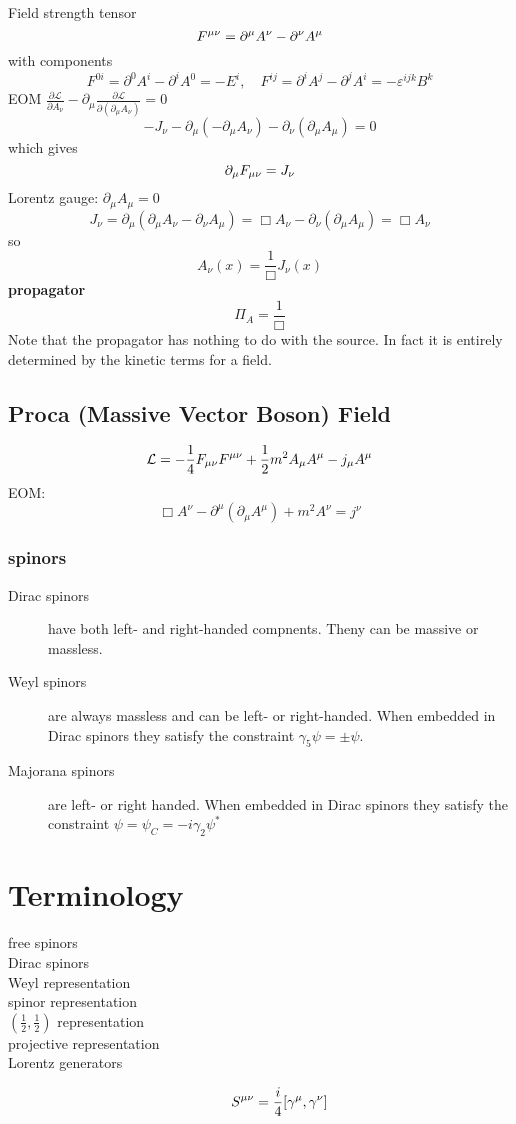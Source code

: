 Field strength tensor 
\[ F^{\mu\nu} = \partial^{\mu}A^{\nu} - \partial^{\nu}A^{\mu} \] 
with components 
\[ F^{0i} = \partial^{0}A^{i} - \partial^{i}A^{0} = -E^{i}, 
\quad
F^{ij} = \partial^{i}A^{j} - \partial^{j}A^{i} = -\varepsilon^{ijk}B^{k} \]
EOM
$\frac{\partial\mathcal{L}}{\partial{A_\nu}}-\partial_\mu\frac{\partial\mathcal{L}}{\partial(\partial_{\mu}A_\nu)}=0$
\[-J_\nu-\partial_\mu(-\partial_{\mu}A_\nu)-\partial_\nu(\partial_{\mu}A_\mu)=0\]
which gives
\[\partial_{\mu}F_{\mu\nu}=J_\nu\]
Lorentz gauge: $\partial_{\mu}A_{\mu}=0$
\[J_{\nu}=\partial_{\mu}(\partial_{\mu}A_\nu-\partial_{\nu}A_{\mu})=\Box{A_\nu}-\partial_{\nu}(\partial_{\mu}A_{\mu})
=\Box{A_{\nu}}\]
so
\[A_{\nu}(x)=\frac{1}{\Box}J_{\nu}(x)\]
\textbf{propagator}
\[\Pi_A=\frac{1}{\Box}\]
Note that the propagator has nothing to do with the source. In fact it is
entirely determined by the kinetic terms for a field.

\subsection{Proca (Massive Vector Boson) Field}
$$ \mathcal{L} = -\frac{1}{4}F_{\mu\nu}F^{\mu\nu} +
\frac{1}{2}m^{2}A_{\mu}A^{\mu} - j_{\mu}A^{\mu} $$
EOM:
$$ \Box A^{\nu} - \partial^{\mu}(\partial_{\mu}A^{\mu}) + m^{2}A^{\nu} =
j^{\nu}$$

\subsubsection{spinors}
\begin{description}
    \item[Dirac spinors] have both left- and right-handed compnents. Theny
	can be massive or massless.
    \item[Weyl spinors] are always massless and can be left- or
	right-handed. When embedded in Dirac spinors they satisfy the
	constraint $\gamma_5\psi=\pm\psi$.
    \item[Majorana spinors] are left- or right handed. When embedded in
	Dirac spinors they satisfy the constraint
	$\psi=\psi_C=-i\gamma_2\psi^*$
\end{description}


\section{Terminology}
\begin{description}
    \item [free spinors]
    \item [Dirac spinors]
    \item [Weyl representation]
    \item [spinor representation]
    \item [$(\frac{1}{2}, \frac{1}{2})$ representation]
    \item [projective representation]
    \item [Lorentz generators]
	\[
	    S^{\mu\nu} = \frac{i}{4}[\gamma^\mu, \gamma^\nu]
	\]
\end{description}


